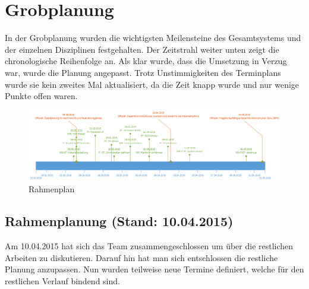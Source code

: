 \section{Grobplanung}

In der Grobplanung wurden die wichtigsten Meilensteine des Gesamtsystems und der einzelnen Disziplinen festgehalten.
Der Zeitstrahl weiter unten zeigt die chronologische Reihenfolge an. Als klar wurde, dass die Umsetzung in Verzug war, wurde die Planung angepasst.
Trotz Unstimmigkeiten des Terminplans wurde sie kein zweites Mal aktualisiert, da die Zeit knapp wurde und nur wenige Punkte offen waren.

\begin{landscape}
	\begin{figure}
		\centering
		\includegraphics[width=1\linewidth]{../../fig/rahmenplanung}
		\caption{Rahmenplan}
		\label{fig:rahmenplanung}
	\end{figure}
\end{landscape}

\subsection{Rahmenplanung (Stand: 10.04.2015)}
Am 10.04.2015 hat sich das Team zusammengeschlossen um über die restlichen Arbeiten zu diskutieren. Darauf hin hat man sich entschlossen die restliche Planung anzupassen. Nun wurden teilweise neue Termine definiert, welche für den restlichen Verlauf bindend sind.

